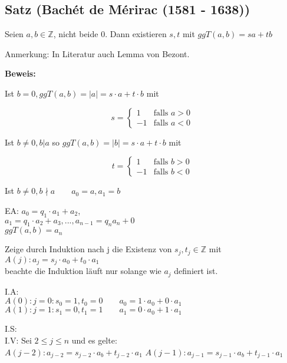 \documentclass[a4paper, 12pt, twoside] {article}
\begin{document}

\subsection{Satz (Bachét de Mérirac (1581 - 1638))} %

Seien $a, b \in \mathbb{Z}$, nicht beide $0$. Dann existieren  $s, t$ mit $ggT(a, b) = sa + tb$

Anmerkung: In Literatur  auch Lemma von Bezont.

\textbf{Beweis:}

Ist $b = 0, ggT(a, b) = |a| = s \cdot a + t \cdot b$ mit

\[ s =
  \begin{cases}
    1 & \text{falls } a > 0 \\
    -1  & \text{falls } a < 0 \
  \end{cases}
\]

Ist $b \neq 0, b | a$ so $ggT(a, b) = |b| = s \cdot a + t \cdot b$ mit

\[ t =
  \begin{cases}
    1 & \text{falls } b > 0 \\
    -1  & \text{falls } b < 0 \
  \end{cases}
\]

Ist $b \neq 0, b \nmid a \qquad a_0 = a, a_1 = b$

EA: $a_0 = q_1 \cdot a_1 + a_2$, \\
$a_1 = q_1 \cdot a_2 + a_3, ... ,a_{n-1} = q_n a_n + 0$ \\
$ggT(a, b) = a_n$

Zeige durch Induktion nach j die Existenz von $s_j, t_j \in \mathbb{Z}$ mit \\
$A(j): a_j = s_j \cdot a_0 + t_0 \cdot a_1$ \\
beachte die Induktion läuft nur solange wie $a_j$ definiert ist.

I.A: \\
$A(0): j = 0: s_0 = 1, t_0 = 0 \qquad a_0 = 1 \cdot a_0 + 0 \cdot a_1$ \checkmark \\

$A(1): j=1: s_1 = 0, t_1 = 1 \qquad a_1 = 0 \cdot a_0 + 1 \cdot a_1$ \checkmark

I.S: \\
I.V: Sei $2 \leq j \leq n$ und es gelte: \\
$A(j-2): a_{j-2} =  s_{j-2} \cdot a_b + t_{j-2} \cdot a_1$
$A(j-1): a_{j-1} =  s_{j-1} \cdot a_b + t_{j-1} \cdot a_1$
\end{document}
